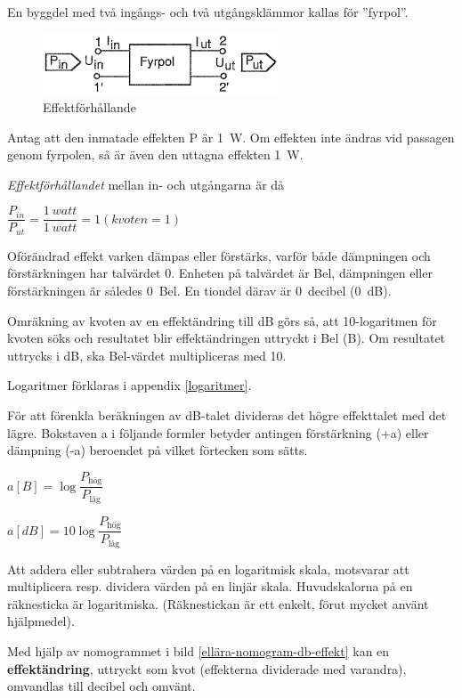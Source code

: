 En byggdel med två ingångs- och två utgångsklämmor kallas för ''fyrpol''.

\begin{figure}[th]
\begin{center}
\includegraphics[width=7cm]{images/cropped_pdfs/bild_2_1-32.pdf}
\caption{Effektförhållande}
\label{fig:BildII1-32}
\end{center}
\end{figure}

Antag att den inmatade effekten P är 1~W. Om effekten inte ändras vid passagen
genom fyrpolen, så är även den uttagna effekten 1~W.

\emph{Effektförhållandet} mellan in- och utgångarna är då

\(\dfrac{P_{in}}{P_{ut}} = \dfrac{1\ watt}{1\ watt} = 1 (kvoten = 1)\)

Oförändrad effekt varken dämpas eller förstärks, varför både dämpningen och
förstärkningen har talvärdet 0. Enheten på talvärdet är Bel, dämpningen eller
förstärkningen är således 0~Bel. En tiondel därav är 0~decibel (0~dB).

Omräkning av kvoten av en effektändring till dB görs så, att 10-logaritmen för
kvoten söks och resultatet blir effektändringen uttryckt i Bel (B). Om
resultatet uttrycks i dB, ska Bel-värdet multipliceras med 10.

Logaritmer förklaras i appendix \ref{logaritmer}.

För att förenkla beräkningen av dB-talet divideras det högre effekttalet med det
lägre. Bokstaven a i följande formler betyder antingen förstärkning (+a) eller
dämpning (-a) beroendet på vilket förtecken som sätts.

\(a[B] = \log \dfrac{P_\text{hög}}{P_\text{låg}}\)

\(a[dB] = 10\log \dfrac{P_\text{hög}}{P_\text{låg}}\)

Att addera eller subtrahera värden på en logaritmisk skala, motsvarar att
multiplicera resp. dividera värden på en linjär skala. Huvudskalorna på en
räknesticka är logaritmiska. (Räknestickan är ett enkelt, förut mycket använt
hjälpmedel).

Med hjälp av nomogrammet i bild \ref{ellära-nomogram-db-effekt} kan en \textbf{effektändring}, uttryckt som kvot
(effekterna dividerade med varandra), omvandlas till decibel och omvänt.


